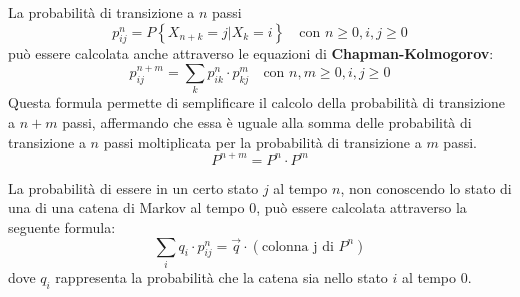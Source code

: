 La probabilità di transizione a $n$ passi
\begin{equation*}
    p_{ij}^n = P \left\{X_{n + k} = j | X_k = i\right\} \quad \text{con } n \geq 0
    , i, j \geq 0
\end{equation*}
può essere calcolata anche attraverso le equazioni di \textbf{Chapman-Kolmogorov}:
\begin{equation}
    p_{ij}^{n+m} = \sum_{k} p_{ik}^n \cdot p_{kj}^m \quad \text{con } n, m \geq 0, i, j \geq 0
\end{equation}
Questa formula permette di semplificare il calcolo della probabilità di transizione
a $n+m$ passi, affermando che essa è uguale alla somma delle probabilità di
transizione a $n$ passi moltiplicata per la probabilità di transizione a $m$ passi.
\begin{equation*}
    P^{n+m} = P^n \cdot P^m
\end{equation*}

La probabilità di essere in un certo stato $j$ al tempo $n$, non conoscendo lo
stato di una di una catena di Markov al tempo $0$, può essere calcolata attraverso
la seguente formula:
\begin{equation}
    \sum_{i} q_i \cdot p_{ij}^n = \vec{q} \cdot (\text{colonna j di } P^n)
\end{equation}
dove $q_i$ rappresenta la probabilità che la catena sia nello stato $i$ al tempo
$0$.

